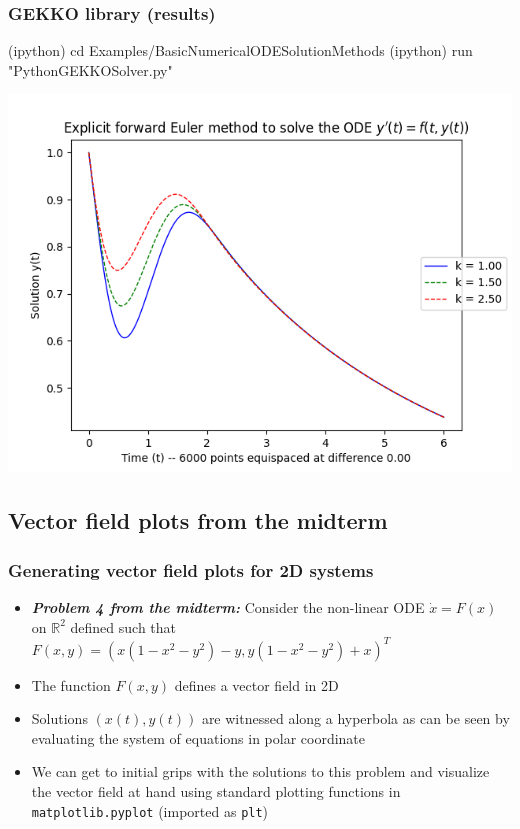 \documentclass[usenames,svgnames,dvipsnames,10pt]{beamer}
\begin{document}
\begin{frame}[fragile]
\frametitle{GEKKO library (results)}

\begin{center}
\begin{code}
(ipython) cd Examples/BasicNumericalODESolutionMethods
(ipython) run "PythonGEKKOSolver.py"
\end{code}
\vskip -0.205cm
\includegraphics[height=0.76\textheight]{../Images/GEKKOPlotOutputs-v1.png}
\end{center}

\end{frame}


\subsection{Vector field plots from the midterm} 

\begin{frame}
\frametitle{Generating vector field plots for 2D systems}

\begin{itemize} 

\item \emph{\textbf{Problem 4 from the midterm:}} 
      Consider the non-linear ODE $\dot{x} = F(x)$ on $\mathbb{R}^2$ defined such that 
      $F(x, y) = \left(x(1-x^2-y^2)-y, y(1-x^2-y^2)+x\right)^T$
\item The function $F(x, y)$ defines a vector field in 2D 
\item Solutions $(x(t), y(t))$ are witnessed along a hyperbola as can be seen by evaluating the 
      system of equations in polar coordinate 
\item We can get to initial grips with the solutions to this problem and 
      visualize the vector field at hand using standard plotting functions in 
      \texttt{matplotlib.pyplot} (imported as \texttt{plt}) 

\end{itemize} 

\end{frame}
\end{document}

